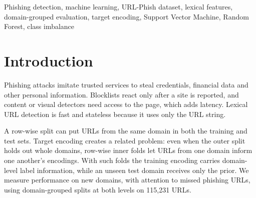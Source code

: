 \documentclass[conference]{IEEEtran}
\begin{document}
\begin{abstract}
Phishing URLs lead users to fraudulent sites that steal credentials and other sensitive data. We evaluate six classifiers on URL-Phish, a dataset of 115{,}231 deduplicated URLs (98{,}641 benign and 16{,}590 phishing) described by 22 lexical and structural features plus the domain and top-level domain. Both the outer train/test split and the inner folds used for out-of-fold target encoding are grouped by domain. In a controlled comparison, row-wise inner folds cut phishing recall by 5 to 23 percentage points for five of the six models (most for Logistic Regression), even though the outer split held out whole domains. Among the six engineered-feature classifiers, the RBF-SVM did best on held-out domains: 96.92\% accuracy, 94.57\% phishing recall and 92.76\% precision, with a mean recall of $95.5\pm1.7\%$ over five repeated splits. Character $n$-gram models of the raw URL reached a higher phishing F1 (up to 97.17\%), but a domain split does not stop models from learning similarities between different domains. Applied unchanged to PhreshPhish, a dataset with different benign sources, the SVM's ROC-AUC fell from 0.993 to 0.762 and its false-positive rate rose from 2.3\% to 41.9\%. The training benign URLs are short, mostly HTTP landing pages, while the external benign URLs are long HTTPS deep links. Domain-grouped results on one dataset therefore do not show transfer to other data.
\end{abstract}

\begin{IEEEkeywords}
Phishing detection, machine learning, URL-Phish dataset, lexical features, domain-grouped evaluation, target encoding, Support Vector Machine, Random Forest, class imbalance
\end{IEEEkeywords}

\section{Introduction}
Phishing attacks imitate trusted services to steal credentials, financial data and other personal information. Blocklists react only after a site is reported, and content or visual detectors need access to the page, which adds latency. Lexical URL detection is fast and stateless because it uses only the URL string.

A row-wise split can put URLs from the same domain in both the training and test sets. Target encoding creates a related problem: even when the outer split holds out whole domains, row-wise inner folds let URLs from one domain inform one another's encodings. With such folds the training encoding carries domain-level label information, while an unseen test domain receives only the prior. We measure performance on new domains, with attention to missed phishing URLs, using domain-grouped splits at both levels on 115{,}231 URLs.
\end{document}
